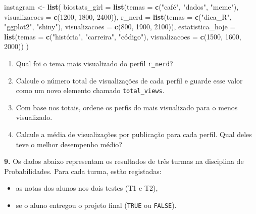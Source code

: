 \documentclass[
]{book}
\newenvironment{Shaded}{\begin{snugshade}}{\end{snugshade}}
\newcommand{\AttributeTok}[1]{\textcolor[rgb]{0.13,0.29,0.53}{#1}}
\newcommand{\DecValTok}[1]{\textcolor[rgb]{0.00,0.00,0.81}{#1}}
\newcommand{\FunctionTok}[1]{\textcolor[rgb]{0.13,0.29,0.53}{\textbf{#1}}}
\newcommand{\NormalTok}[1]{#1}
\newcommand{\OtherTok}[1]{\textcolor[rgb]{0.56,0.35,0.01}{#1}}
\newcommand{\StringTok}[1]{\textcolor[rgb]{0.31,0.60,0.02}{#1}}
\begin{document}
\begin{Shaded}
\begin{Highlighting}[]
\NormalTok{instagram }\OtherTok{\textless{}{-}} \FunctionTok{list}\NormalTok{(}
  \AttributeTok{biostats\_girl =} \FunctionTok{list}\NormalTok{(}\AttributeTok{temas =} \FunctionTok{c}\NormalTok{(}\StringTok{"café"}\NormalTok{, }\StringTok{"dados"}\NormalTok{, }\StringTok{"meme"}\NormalTok{), }\AttributeTok{visualizacoes =} \FunctionTok{c}\NormalTok{(}\DecValTok{1200}\NormalTok{, }\DecValTok{1800}\NormalTok{, }\DecValTok{2400}\NormalTok{)),}
  \AttributeTok{r\_nerd =} \FunctionTok{list}\NormalTok{(}\AttributeTok{temas =} \FunctionTok{c}\NormalTok{(}\StringTok{"dica\_R"}\NormalTok{, }\StringTok{"ggplot2"}\NormalTok{, }\StringTok{"shiny"}\NormalTok{), }\AttributeTok{visualizacoes =} \FunctionTok{c}\NormalTok{(}\DecValTok{800}\NormalTok{, }\DecValTok{1900}\NormalTok{, }\DecValTok{2100}\NormalTok{)),}
  \AttributeTok{estatistica\_hoje =} \FunctionTok{list}\NormalTok{(}\AttributeTok{temas =} \FunctionTok{c}\NormalTok{(}\StringTok{"história"}\NormalTok{, }\StringTok{"carreira"}\NormalTok{, }\StringTok{"código"}\NormalTok{), }\AttributeTok{visualizacoes =} \FunctionTok{c}\NormalTok{(}\DecValTok{1500}\NormalTok{, }\DecValTok{1600}\NormalTok{, }\DecValTok{2000}\NormalTok{))}
\NormalTok{)}
\end{Highlighting}
\end{Shaded}

\begin{enumerate}
\def\labelenumi{(\alph{enumi})}
\item
  Qual foi o tema mais visualizado do perfil \texttt{r\_nerd}?
\item
  Calcule o número total de visualizações de cada perfil e guarde esse valor como um novo elemento chamado \texttt{total\_views}.
\item
  Com base nos totais, ordene os perfis do mais visualizado para o menos visualizado.
\item
  Calcule a média de visualizações por publicação para cada perfil. Qual deles teve o melhor desempenho médio?
\end{enumerate}

\textbf{9.} Os dados abaixo representam os resultados de três turmas na disciplina de Probabilidades. Para cada turma, estão registadas:

\begin{itemize}
\item
  as notas dos alunos nos dois testes (T1 e T2),
\item
  se o aluno entregou o projeto final (\texttt{TRUE} ou \texttt{FALSE}).
\end{itemize}
\end{document}
